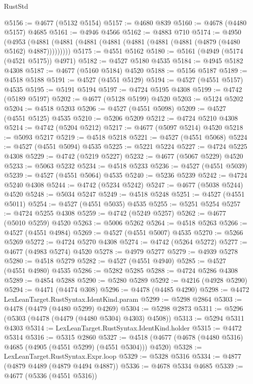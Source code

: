 \begin{lexlean}{RustStd}
\begin{coremodule}
@5156 := @4677 (@5132 @5154)
@5157 := @4680 @839
@5160 := @4678 (@4480 @5157) @4685
@5161 := @4946 @4566
@5162 := @4883 @710
@5174 := @4950
    (@4953 (@4881 (@4881 (@4881 (@4881 (@4881 (@4881 (@4881 (@4879 (@4480 @5162) @4887)))))))))
@5175 := @4551 @5162
@5180 := @5161 (@4949 (@5174 (@4521 @5175)) @4971)
@5182 := @4527 @5180 @4535
@5184 := @4945 @5182 @4308
@5187 := @4677 (@5160 @5184) @4520
@5188 := @5156 @5187
@5189 := @4518 @5188
@5191 := @4527 (@4551 @5129)
@5194 := @4527 (@4551 @5157) @4535
@5195 := @5191 @5194
@5197 := @4724 @5195 @4308
@5199 := @4742 (@5189 @5197)
@5202 := @4677 (@5128 @5199) @4520
@5203 := @5124 @5202
@5204 := @4518 @5203
@5206 := @4527 (@4551 @5098)
@5209 := @4527 (@4551 @5125) @4535
@5210 := @5206 @5209
@5212 := @4724 @5210 @4308
@5214 := @4742 (@5204 @5212)
@5217 := @4677 (@5097 @5214) @4520
@5218 := @5093 @5217
@5219 := @4518 @5218
@5221 := @4527 (@4551 @5068)
@5224 := @4527 (@4551 @5094) @4535
@5225 := @5221 @5224
@5227 := @4724 @5225 @4308
@5229 := @4742 (@5219 @5227)
@5232 := @4677 (@5067 @5229) @4520
@5233 := @5063 @5232
@5234 := @4518 @5233
@5236 := @4527 (@4551 @5039)
@5239 := @4527 (@4551 @5064) @4535
@5240 := @5236 @5239
@5242 := @4724 @5240 @4308
@5244 := @4742 (@5234 @5242)
@5247 := @4677 (@5038 @5244) @4520
@5248 := @5034 @5247
@5249 := @4518 @5248
@5251 := @4527 (@4551 @5011)
@5254 := @4527 (@4551 @5035) @4535
@5255 := @5251 @5254
@5257 := @4724 @5255 @4308
@5259 := @4742 (@5249 @5257)
@5262 := @4677 (@5010 @5259) @4520
@5263 := @5006 @5262
@5264 := @4518 @5263
@5266 := @4527 (@4551 @4984)
@5269 := @4527 (@4551 @5007) @4535
@5270 := @5266 @5269
@5272 := @4724 @5270 @4308
@5274 := @4742 (@5264 @5272)
@5277 := @4677 (@4983 @5274) @4520
@5278 := @4979 @5277
@5279 := @4939 @5278
@5280 := @4518 @5279
@5282 := @4527 (@4551 @4940)
@5285 := @4527 (@4551 @4980) @4535
@5286 := @5282 @5285
@5288 := @4724 @5286 @4308
@5289 := @4854 @5288
@5290 := @5280 @5289
@5292 := @4216 (@4928 @5290)
@5294 := @4471 (@4474 @308)
@5296 := @4478 (@4485 @4290)
@5298 := @4472 LexLeanTarget.RustSyntax.IdentKind.param
@5299 := @5298 @2864
@5303 := @4478 (@4479 (@4480 @5299) @4269)
@5304 := @5298 @2873
@5311 := @5296 (@5303 (@4478 (@4479 (@4480 @5304) @4303) @4508))
@5313 := @5294 @5311 @4303
@5314 := LexLeanTarget.RustSyntax.IdentKind.holder
@5315 := @4472 @5314
@5316 := @5315 @2860
@5327 := @4518 (@4677 (@4678 (@4480 @5316) @4685 (@4905 (@4551 @5299) (@4551 @5304))) @4520)
@5328 := LexLeanTarget.RustSyntax.Expr.loop
@5329 := @5328 @5316
@5334 := @4877 (@4879 @4489 (@4879 @4494 @4887))
@5336 := @4678 @5334 @4685
@5339 := @4677 (@5336 (@4551 @5316))

\end{coremodule}
\end{lexlean}
